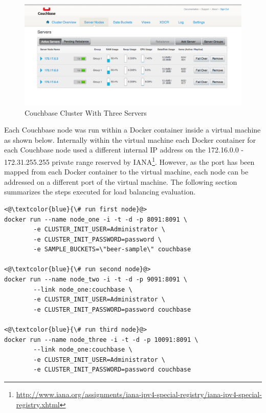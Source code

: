 \documentclass[a4paper,11pt,twoside]{report}
\begin{document}
\begin{figure}[!ht]
  \centering
     \includegraphics[scale=0.40]{couchbase_cluster}
  \caption{Couchbase Cluster With Three Servers}
  \label{couchbase_cluster}
\end{figure} 

Each Couchbase node was run within a Docker container inside a virtual machine as shown below. Internally within the virtual machine each Docker container for each Couchbase node used a different internal IP address on the 172.16.0.0 - 172.31.255.255 private range reserved by IANA\footnote{\label{IANA} \url{http://www.iana.org/assignments/iana-ipv4-special-registry/iana-ipv4-special-registry.xhtml}}.  However, as the port has been mapped from each Docker container to the virtual machine, each node can be addressed on a different port of the virtual machine. The following section summarizes the steps executed for load balancing evaluation. \bigskip

\begin{lstlisting}[language=terminal]
<@\textcolor{blue}{\# run first node}@>
docker run --name node_one -i -t -d -p 8091:8091 \
		-e CLUSTER_INIT_USER=Administrator \
		-e CLUSTER_INIT_PASSWORD=password \
		-e SAMPLE_BUCKETS=\"beer-sample\" couchbase

<@\textcolor{blue}{\# run second node}@>
docker run --name node_two -i -t -d -p 9091:8091 \
		--link node_one:couchbase \
		-e CLUSTER_INIT_USER=Administrator \
		-e CLUSTER_INIT_PASSWORD=password couchbase

<@\textcolor{blue}{\# run third node}@>
docker run --name node_three -i -t -d -p 10091:8091 \
		--link node_one:couchbase \
		-e CLUSTER_INIT_USER=Administrator \
		-e CLUSTER_INIT_PASSWORD=password couchbase
\end{lstlisting}
\end{document}

